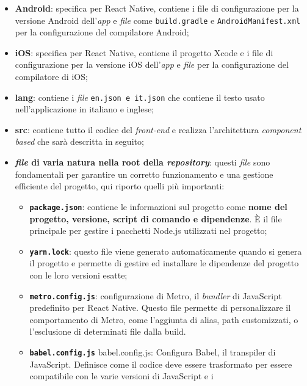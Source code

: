 \begin{itemize}
    \item \textbf{Android}: specifica per React Native, contiene i file di configurazione 
          per la versione Android dell'\textit{app} e \textit{file} come \texttt{build.gradle} e \texttt{AndroidManifest.xml} 
          per la configurazione del compilatore Android;
    \item \textbf{iOS}: specifica per React Native, contiene il progetto Xcode e i file di configurazione 
          per la versione iOS dell'\textit{app} e \textit{file} per la configurazione del compilatore di iOS;
    \item \textbf{lang}: contiene i \textit{file} \texttt{en.json e it.json} che contiene il testo usato nell'applicazione 
          in italiano e inglese;
    \item \textbf{src}: contiene tutto il codice del \textit{front-end} e realizza l'architettura \textit{component 
          based} che sarà descritta in seguito;
    \item \textbf{\textit{file} di varia natura nella root della \textit{repository}}: questi \textit{file} sono fondamentali 
          per garantire un corretto funzionamento e una gestione efficiente del progetto, qui riporto quelli più importanti:
          \begin{itemize}
            \item \textbf{\texttt{package.json}}: contiene le informazioni sul progetto come \textbf{nome del progetto, versione,
                  script di comando e dipendenze}. È il file principale per gestire i pacchetti Node.js utilizzati nel progetto;
            \item \textbf{\texttt{yarn.lock}}: questo file viene generato automaticamente quando si genera il progetto e 
                  permette di gestire ed installare le dipendenze del progetto con le loro versioni esatte;
            \item \textbf{\texttt{metro.config.js}}: configurazione di Metro, il \textit{bundler} di JavaScript predefinito 
                  per React Native. Questo file permette di personalizzare il comportamento di Metro, come 
                  l'aggiunta di alias, path customizzati, o l'esclusione di determinati file dalla build.
            \item \textbf{\texttt{babel.config.js}} babel.config.js: Configura Babel, il transpiler di JavaScript. 
                  Definisce come il codice deve essere trasformato per essere compatibile con le varie versioni di JavaScript e i 

\end{itemize}
\end{itemize}
